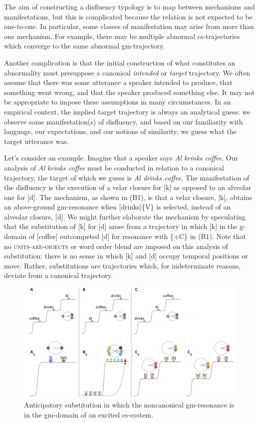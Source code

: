  The aim of constructing a disfluency typology is to map between mechanisms and manifestations, but this is complicated because the relation is not expected to be one-to-one. In particular, some classes of manifestation may arise from more than one mechanism. For example, there may be multiple abnormal cs-trajectories which converge to the same abnormal gm-trajectory. 

  Another complication is that the initial construction of what constitutes an abnormality must presuppose a canonical \textit{intended} or \textit{target} trajectory. We often assume that there was some utterance a speaker intended to produce, that something went wrong, and that the speaker produced something else. It may not be appropriate to impose these assumptions in many circumstances. In an empirical context, the implied target trajectory is always an analytical guess: we observe some manifestation(s) of disfluency, and based on our familiarity with language, our expectations, and our notions of similarity, we guess what the target utterance was.

  Let's consider an example. Imagine that a speaker says \textit{Al krinks coffee}. Our analysis of \textit{Al krinks coffee} must be conducted in relation to a canonical trajectory, the target of which we guess is \textit{Al drinks coffee}. The manifestation of the disfluency is the execution of a velar closure for [k] as opposed to an alveolar one for [d]. The mechanism, as shown in {}(B1), is that a velar closure, [k], obtains an above-ground gm-resonance when [drinks]\{V\} is selected, instead of an alveolar closure, [d]. We might further elaborate the mechanism by speculating that the substitution of [k] for [d] arose from a trajectory in which [k] in the g-domain of [coffee] outcompeted [d] for resonance with \{+C\} in (B1). Note that no \textsc{units}\textsc{{}-are-}\textsc{objects} or word order blend are imposed on this analysis of substitution: there is no sense in which [k] and [d] occupy temporal positions or move. Rather, substitutions are trajectories which, for indeterminate reasons, deviate from a canonical trajectory. 

  
\begin{figure}
\includegraphics[width=\textwidth]{figures/Tilsen-img58.png}
\caption{Anticipatory substitution in which the noncanonical gm-resonance is in the gm-domain of an excited cs-system.}
\label{fig:4:8}
\end{figure}
 

